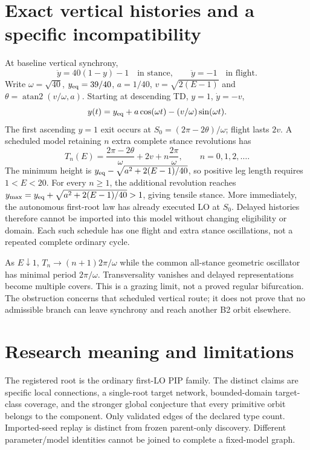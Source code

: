 \documentclass[11pt]{article}
\begin{document}
\section{Exact vertical histories and a specific incompatibility}
At baseline vertical synchrony,
\[
\ddot y=40(1-y)-1\quad\text{in stance},\qquad
\ddot y=-1\quad\text{in flight}.
\]
Write $\omega=\sqrt{40}$, $y_{\rm eq}=39/40$, $a=1/40$,
$v=\sqrt{2(E-1)}$ and $\theta=\operatorname{atan2}(v/\omega,a)$.
Starting at descending TD, $y=1$, $\dot y=-v$,
\[
y(t)=y_{\rm eq}+a\cos(\omega t)-(v/\omega)\sin(\omega t).
\]
The first ascending $y=1$ exit occurs at
$S_0=(2\pi-2\theta)/\omega$; flight lasts $2v$. A scheduled model retaining
$n$ extra complete stance revolutions has
\begin{equation}\label{eq:vertical}
T_n(E)=\frac{2\pi-2\theta}{\omega}+2v+n\frac{2\pi}{\omega},
\qquad n=0,1,2,\ldots.
\end{equation}
The minimum height is
$y_{\rm eq}-\sqrt{a^2+2(E-1)/40}$, so positive leg length requires
$1<E<20$. For every $n\ge1$, the additional revolution reaches
$y_{\max}=y_{\rm eq}+\sqrt{a^2+2(E-1)/40}>1$, giving tensile stance.
More immediately, the autonomous first-root law has already executed LO
at $S_0$. Delayed histories therefore cannot be imported into this model
without changing eligibility or domain. Each such schedule has one flight
and extra stance oscillations, not a repeated complete ordinary cycle.

As $E\downarrow1$, $T_n\to(n+1)2\pi/\omega$ while the common all-stance
geometric oscillator has minimal period $2\pi/\omega$. Transversality
vanishes and delayed representations become multiple covers. This is a
grazing limit, not a proved regular bifurcation. The obstruction concerns
that scheduled vertical route; it does not prove that no admissible branch
can leave synchrony and reach another B2 orbit elsewhere.

\section{Research meaning and limitations}
The registered root is the ordinary first-LO PIP family. The distinct
claims are specific local connections, a single-root target network,
bounded-domain target-class coverage, and the stronger global conjecture
that every primitive orbit belongs to the component. Only validated edges
of the declared type count. Imported-seed replay is distinct from frozen
parent-only discovery. Different parameter/model identities cannot be joined
to complete a fixed-model graph.
\end{document}
